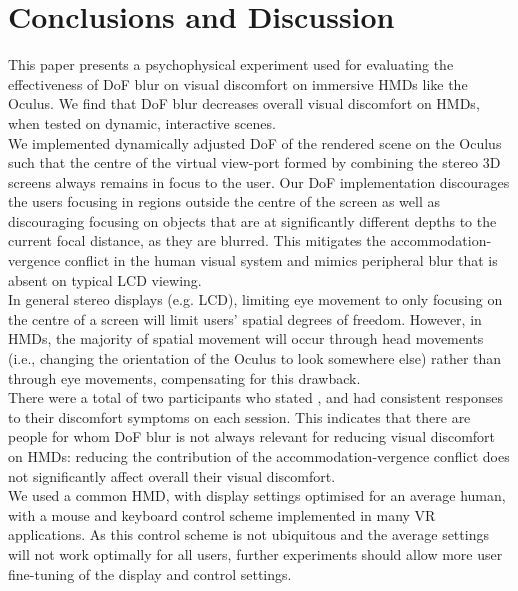 \section{Conclusions and Discussion}

This paper presents a psychophysical experiment used for evaluating the effectiveness of DoF blur on visual discomfort on immersive HMDs like the Oculus. We find that DoF blur decreases overall visual discomfort on HMDs, when tested on dynamic, interactive scenes.\\

We implemented dynamically adjusted DoF of the rendered scene on the Oculus such that the centre of the virtual view-port formed by combining the stereo 3D screens always remains in focus to the user. Our DoF implementation discourages the users focusing in regions outside the centre of the screen as well as discouraging focusing on objects that are at significantly different depths to the current focal distance, as they are blurred. This mitigates the accommodation-vergence conflict in the human visual system and mimics peripheral blur that is absent on typical LCD viewing.\\

In general stereo displays (e.g. LCD), limiting eye movement to only focusing on the centre of a screen will limit users' spatial degrees of freedom. However, in HMDs, the majority of spatial movement will occur through head movements (i.e., changing the orientation of the Oculus to look somewhere else) rather than through eye movements, compensating for this drawback.\\

There were a total of two participants who stated , and had consistent responses to their discomfort symptoms on each session. This indicates that there are people for whom DoF blur is not always relevant for reducing visual discomfort on HMDs: reducing the contribution of the accommodation-vergence conflict does not significantly affect overall their visual discomfort. \\


We used a common HMD, with display settings optimised for an average human, with a mouse and keyboard control scheme implemented in many VR applications. As this control scheme is not ubiquitous and the average settings will not work optimally for all users, further experiments should allow more user fine-tuning of the display and control settings.\\


